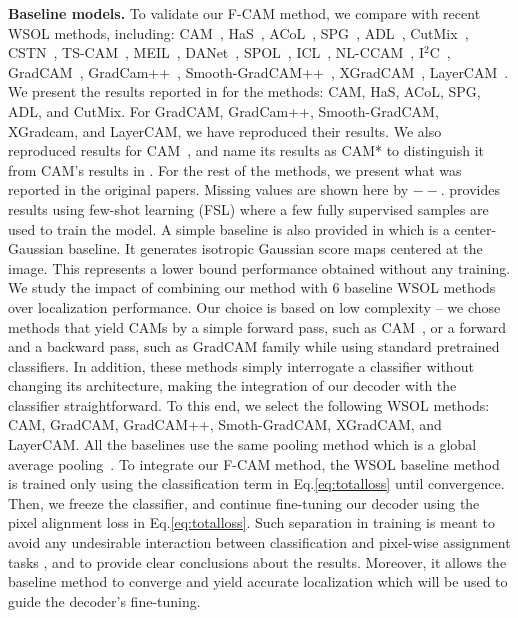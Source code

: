 \documentclass[twocolumn]{article}
\theoremstyle{definition}
\begin{document}
\noindent \textbf{Baseline models.}
To validate our F-CAM method, we compare with recent WSOL methods, including: CAM~\cite{zhou2016learning}, HaS~\cite{SinghL17}, ACoL~\cite{ZhangWF0H18}, SPG~\cite{ZhangWKYH18}, ADL~\cite{ChoeS19}, CutMix~\cite{YunHCOYC19}, CSTN~\cite{MeethalPBG20icprcstn}, TS-CAM~\cite{gao2021tscam}, MEIL~\cite{Mai20CVPRmeil}, DANet~\cite{XueLWJJY19iccvdanet}, SPOL~\cite{wei2021shallowspol}, ICL~\cite{KiU0B20icl}, NL-CCAM~\cite{YangKKK20nlccam}, I${^2}$C~\cite{ZhangW020i2c}, GradCAM~\cite{SelvarajuCDVPB17iccvgradcam}, GradCam++~\cite{ChattopadhyaySH18wacvgradcampp}, Smooth-GradCAM++~\cite{omeiza2019corr}, XGradCAM~\cite{fu2020axiom}, LayerCAM~\cite{JiangZHCW21layercam}. We present the results reported in \cite{choe2020evaluating} for the methods: CAM, HaS, ACoL, SPG, ADL, and CutMix. For GradCAM, GradCam++, Smooth-GradCAM, XGradcam, and LayerCAM, we have reproduced their results. We also reproduced results for CAM~\cite{zhou2016learning}, and name its results as CAM* to distinguish it from CAM's results in \cite{choe2020evaluating}. For the rest of the methods, we present what was reported in the original papers. Missing values are shown here by ${--}$. \cite{choe2020evaluating} provides results using few-shot learning (FSL) where a few fully supervised samples are used to train the model. A simple baseline is also provided in \cite{choe2020evaluating} which is a center-Gaussian baseline. It generates isotropic Gaussian score maps centered at the image. This represents a lower bound performance obtained without any training.
We study the impact of combining our method with 6 baseline WSOL methods over localization performance. Our choice is based on low complexity -- we chose methods that yield CAMs by a simple forward pass, such as CAM~\cite{zhou2016learning}, or a forward and a backward pass, such as GradCAM family while using standard pretrained classifiers. In addition, these methods simply interrogate a classifier without changing its architecture, making the integration of our decoder with the classifier straightforward. To this end, we select the following WSOL methods: CAM, GradCAM, GradCAM++, Smoth-GradCAM, XGradCAM, and LayerCAM. All the baselines use the same pooling method which is a global average pooling~\cite{zhou2016learning}.
To integrate our F-CAM method, the WSOL baseline method is trained only using the classification term in Eq.\ref{eq:totalloss} until convergence. Then, we freeze the classifier, and continue fine-tuning our decoder using the pixel alignment loss in Eq.\ref{eq:totalloss}. Such separation in training is meant to avoid any undesirable interaction between classification and pixel-wise assignment tasks \cite{belharbi2020DeepAlJoinClSegWeakAnn}, and to provide clear conclusions about the results. Moreover, it allows the baseline method to converge and yield accurate localization which will be used to guide the decoder's fine-tuning.
\end{document}
